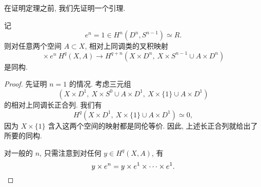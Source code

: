 在证明定理之前, 我们先证明一个引理.

\begin{lemma}
    记
    \[ e^n = 1 \in H^n(D^n, S^{n - 1}) \simeq R. \]
    则对任意两个空间 $A \subset X$, 相对上同调类的叉积映射
    \[ 
        {} \times e^n \:
        H^q (X, A) \to
        H^{q+n} (X \times D^n,\ X \times S^{n - 1} \cup A \times D^n)
    \]
    是同构.
\end{lemma}

\begin{proof}
    先证明 $n = 1$ 的情况. 考虑三元组
    \[ (
        X \times D^1,\ 
        X \times S^0 \cup A \times D^1,\ 
        X \times \{1\} \cup A \times D^1
    ) \]
    的相对上同调长正合列. 我们有
    \[ H^q (X \times D^1,\ X \times \{1\} \cup A \times D^1) \simeq 0, \]
    因为 $X \times \{1\}$ 含入这两个空间的映射都是同伦等价.
    因此, 上述长正合列就给出了所要的同构.

    对一般的 $n$, 只需注意到对任何 $y \in H^q (X, A)$, 有
    \[ y \times e^n = y \times e^1 \times \cdots \times e^1. \qedhere \]
\end{proof}

